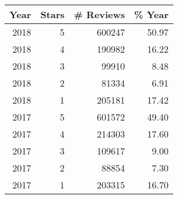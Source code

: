 \begin{tabular}{rrrr}
\toprule
 Year &  Stars &  \# Reviews &  \% Year \\
\midrule
 2018 &      5 &     600247 &   50.97 \\
 2018 &      4 &     190982 &   16.22 \\
 2018 &      3 &      99910 &    8.48 \\
 2018 &      2 &      81334 &    6.91 \\
 2018 &      1 &     205181 &   17.42 \\
 2017 &      5 &     601572 &   49.40 \\
 2017 &      4 &     214303 &   17.60 \\
 2017 &      3 &     109617 &    9.00 \\
 2017 &      2 &      88854 &    7.30 \\
 2017 &      1 &     203315 &   16.70 \\
\bottomrule
\end{tabular}
